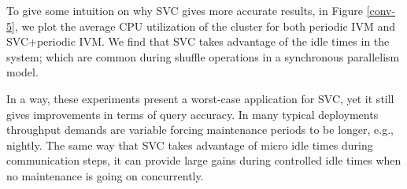 To give some intuition on why SVC gives more accurate results, in Figure \ref{conv-5}, we plot the average CPU utilization of the cluster for both periodic IVM and SVC+periodic IVM. 
We find that SVC takes advantage of the idle times in the system; which are common during shuffle operations in a synchronous parallelism model.

In a way, these experiments present a worst-case application for SVC, yet it still gives improvements in terms of query accuracy.
In many typical deployments throughput demands are variable forcing maintenance periods to be longer, e.g., nightly.
The same way that SVC takes advantage of micro idle times during communication steps, it can provide large gains during controlled idle times when no maintenance is going on concurrently.



